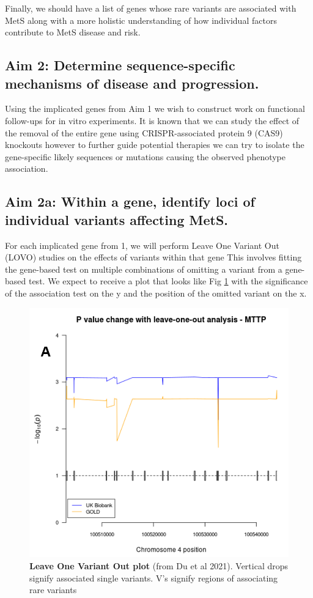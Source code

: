 \documentclass[11pt]{article}
\begin{document}
Finally, we should have a list of genes whose rare variants are associated with MetS along with a more holistic understanding of how individual factors contribute to MetS disease and risk.

\subsection*{Aim 2: Determine sequence-specific mechanisms of disease and progression.}

Using the implicated genes from Aim 1 we wish to construct work on functional follow-ups for in vitro experiments. It is known that we can study the effect of the removal of the entire gene using CRISPR-associated protein 9 (CAS9) knockouts however to further guide potential therapies we can try to isolate the gene-specific likely sequences or mutations causing the observed phenotype association.

\subsection*{Aim 2a: Within a gene, identify loci of individual variants affecting MetS.} 

For each implicated gene from 1, we will perform Leave One Variant Out (LOVO) studies on the effects of variants within that gene This involves fitting the gene-based test on multiple combinations of omitting a variant from a gene-based test. We expect to receive a plot that looks like Fig \ref{fig:f2} with the significance of the association test on the y and the position of the omitted variant on the x.

\begin{figure}[h]
  \includegraphics[width=0.7\linewidth]{"images/fig2.png"} 
  \caption{\textbf{Leave One Variant Out plot} (from Du et al 2021). Vertical drops signify associated single variants. V's signify regions of associating rare variants}
  \label{fig:f2}
\end{figure}
  
\end{document}
